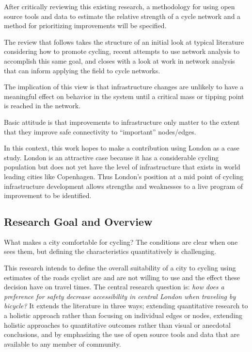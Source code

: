 After critically reviewing this existing research, a methodology for using open source tools and data to estimate the relative strength of a cycle network and a method for prioritizing improvements will be specified. 

The review that follows takes the structure of an initial look at typical literature considering how to promote cycling, recent attempts to use network analysis to accomplish this same goal, and closes with a look at work in network analysis that can inform applying the field to cycle networks.

 The implication of this view is that infrastructure changes are unlikely to have a meaningful effect on behavior in the system until a critical mass or tipping point is reached in the network. 

Basic attitude is that improvements to infrastructure only matter to the extent that they improve safe connectivity to ``important'' nodes/edges. 

In this context, this work hopes to make a contribution using London as a case study. London is an attractive case because it has a considerable cycling population but does not yet have the level of infrastructure that exists in world leading cities like Copenhagen. Thus London's position at a mid point of cycling infrastructure development allows strengths and weaknesses to a live program of improvement to be identified. 

\subsection{Research Goal and Overview}

What makes a city comfortable for cycling? The conditions are clear when one sees them, but defining the characteristics quantitatively is challenging. 

This research intends to define the overall suitability of a city to cycling using estimates of the roads cyclist are and are not willing to use and the effect these decision have on travel times. The central research question is: \textit{how does a preference for safety decrease accessibility in central London when traveling by bicycle?} It extends the literature in three ways; extending quantitative research to a holistic approach rather than focusing on individual edges or nodes, extending holistic approaches to quantitative outcomes rather than visual or anecdotal conclusions, and by emphasizing the use of open source tools and data that are available to any member of community. 

